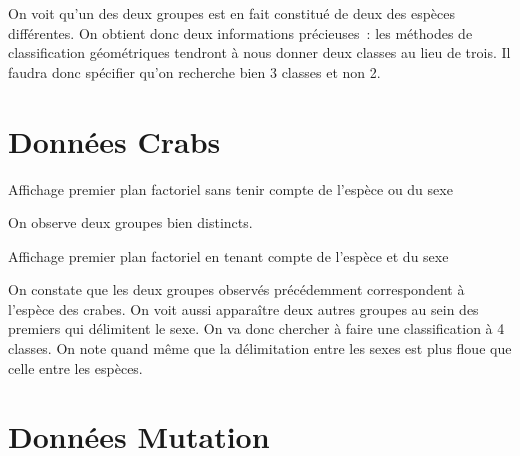 \documentclass[a4paper,10pt]{report}
\begin{document}
On voit qu'un des deux groupes est en fait constitué de deux des espèces différentes. 
On obtient donc deux informations précieuses~: les méthodes de classification géométriques tendront à nous donner deux classes au lieu de trois. Il faudra donc spécifier qu'on recherche bien 3 classes et non 2.


\section{Données Crabs}

Affichage premier plan factoriel sans tenir compte de l'espèce ou du sexe

On observe deux groupes bien distincts.


Affichage premier plan factoriel en tenant compte de l'espèce et du sexe

On constate que les deux groupes observés précédemment correspondent à l'espèce des crabes. On voit aussi apparaître deux autres groupes au sein des premiers qui délimitent le sexe.
On va donc chercher à faire une classification à 4 classes. On note quand même que la délimitation entre les sexes est plus floue que celle entre les espèces.


\section{Données Mutation}
\end{document}
